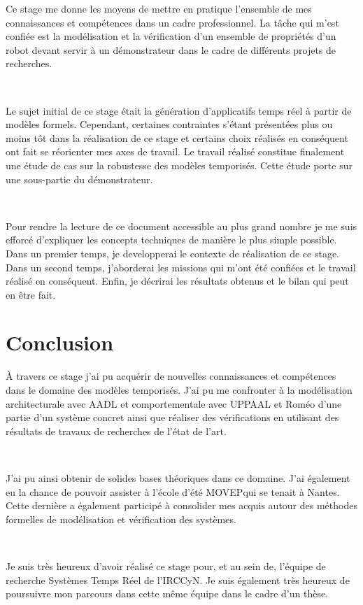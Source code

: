 \documentclass{report}
\begin{document}
    Ce stage me donne les moyens de mettre en pratique l'ensemble de mes
    connaissances et compétences dans un cadre professionnel. La tâche qui m'est
    confiée est la modélisation et la vérification d'un ensemble de propriétés
    d'un robot devant servir à un démonstrateur dans le cadre de différents
    projets de recherches.

    ~

    Le sujet initial de ce stage était la génération d'applicatifs temps réel à
    partir de modèles formels. Cependant, certaines contraintes s'étant
    présentées plus ou moins tôt dans la réalisation de ce stage et certains
    choix réalisés en conséquent ont fait se réorienter mes axes de travail. Le
    travail réalisé constitue finalement une étude de cas sur la robustesse des
    modèles temporisés. Cette étude porte sur une sous-partie du démonstrateur.

    ~

    Pour rendre la lecture de ce document accessible au plus grand nombre je me
    suis efforcé d'expliquer les concepts techniques de manière le plus simple
    possible. Dans un premier temps, je developperai le contexte de
    réalisation de ce stage. Dans un second temps, j'aborderai les missions qui
    m'ont été confiées et le travail réalisé en conséquent. Enfin, je décrirai
    les résultats obtenus et le bilan qui peut en être fait.
    
  
  
  
  
  \chapter*{Conclusion}

    À travers ce stage j'ai pu acquérir de nouvelles connaissances et
    compétences dans le domaine des modèles temporisés. J'ai pu me confronter à
    la modélisation architecturale avec AADL et comportementale avec UPPAAL et
    Roméo d'une partie d'un système concret ainsi que réaliser des vérifications
    en utilisant des résultats de travaux de recherches de l'état de l'art.

    ~
    
    J'ai pu ainsi obtenir de solides bases théoriques dans ce domaine. J'ai
    également eu la chance de pouvoir assister à l'école d'été
    MOVEP\footnotemark qui se tenait à Nantes. Cette dernière a également
    participé à consolider mes acquis autour des méthodes formelles de
    modélisation et vérification des systèmes.

    ~
 
    Je suis très heureux d'avoir réalisé ce stage pour, et au sein de, l'équipe
    de recherche Systèmes Temps Réel de l'IRCCyN. Je suis également très
    heureux de poursuivre mon parcours dans cette même équipe dans le cadre d'un
    thèse.

  \appendix
  
  
\end{document}
